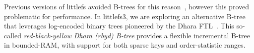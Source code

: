 \documentclass[letterpaper,twocolumn,10pt]{article}
\def\lfs+{littlefs}
\def\lfsiii+{avianfs}
\def\lfsiii+{littlefs3}
\begin{document}
Previous versions of \lfs+ avoided B-trees for this reason~\cite{littlefs2},
however this proved problematic for performance.
In \lfsiii+, we are exploring an alternative B-tree that leverages
log-encoded binary trees pioneered by the Dhara FTL~\cite{dhara}.
This so-called
\emph{red-black-yellow Dhara (rbyd) B-tree}
provides a
flexible incremental B-tree in bounded-RAM,
with support for both sparse keys and order-statistic ranges.
\end{document}
